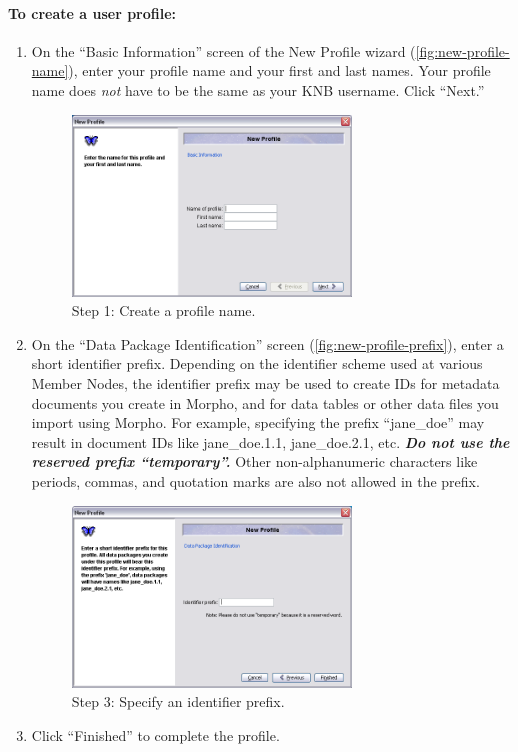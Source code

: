 \paragraph{To create a user profile:}
\begin{enumerate}
  \item On the ``Basic Information'' screen of the New Profile wizard
    (\autoref{fig:new-profile-name}), enter your profile name and your
    first and last names. Your profile name does \emph{not} have to be
    the same as your KNB username. Click ``Next.''

  \begin{figure}
    \centering
      \includegraphics[width=0.7\textwidth]{images/new-profile-name.png}
    \caption{Step 1: Create a profile name.}
    \label{fig:new-profile-name}
  \end{figure}

  \item On the ``Data Package Identification'' screen
    (\autoref{fig:new-profile-prefix}), enter a short identifier prefix.
    Depending on the identifier scheme used at various Member Nodes, 
    the identifier prefix may be used to create IDs for metadata
    documents you create in Morpho, and for data tables or other data
    files you import using Morpho. For example, specifying the prefix
    ``jane\_doe'' may result in document IDs like jane\_doe.1.1,
    jane\_doe.2.1, etc. \emph{\textbf{Do not use the reserved prefix
    ``temporary''.}} Other non-alphanumeric characters like periods, 
    commas, and quotation marks are also not allowed in the prefix.

  \begin{figure}
    \centering
      \includegraphics[width=0.7\textwidth]{images/new-profile-prefix.png}
    \caption{Step 3: Specify an identifier prefix.}
    \label{fig:new-profile-prefix}
  \end{figure}

  \item Click ``Finished'' to complete the profile.
\end{enumerate}

